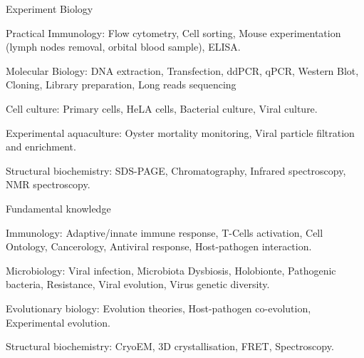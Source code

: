 \begin{cventries}
  \cventry
    {Experiment} %
    {Biology} %
    {} %
    {} %
    {
      \begin{cvitems} %
        \item {Practical Immunology: Flow cytometry, Cell sorting, Mouse experimentation (lymph nodes removal, orbital blood sample), ELISA.}
        \item {Molecular Biology: DNA extraction, Transfection, ddPCR, qPCR, Western Blot, Cloning, Library preparation, Long reads sequencing}
        \item {Cell culture: Primary cells, HeLA cells, Bacterial culture, Viral culture.}
        \item {Experimental aquaculture: Oyster mortality monitoring, Viral particle filtration and enrichment.}
        \item {Structural biochemistry: SDS-PAGE, Chromatography, Infrared spectroscopy, NMR spectroscopy.}
      \end{cvitems}
    }

  \cventry
    {Fundamental knowledge} %
    {} %
    {} %
    {} %
    {
      \begin{cvitems} %
        \item {Immunology: Adaptive/innate immune response, T-Cells activation, Cell Ontology, Cancerology, Antiviral response, Host-pathogen interaction.}
        \item {Microbiology: Viral infection, Microbiota Dysbiosis, Holobionte, Pathogenic bacteria, Resistance, Viral evolution, Virus genetic diversity.}
        \item {Evolutionary biology: Evolution theories, Host-pathogen co-evolution, Experimental evolution.}
        \item {Structural biochemistry: CryoEM, 3D crystallisation, FRET, Spectroscopy.}
      \end{cvitems}
    }


\end{cventries}
